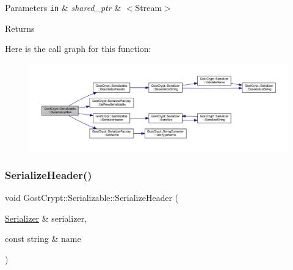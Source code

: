 \begin{DoxyParams}[1]{Parameters}
\mbox{\tt in}  & {\em shared\+\_\+ptr} & $<$\+Stream$>$ \\
\hline
\end{DoxyParams}
\begin{DoxyReturn}{Returns}

\end{DoxyReturn}
Here is the call graph for this function\+:
\nopagebreak
\begin{figure}[H]
\begin{center}
\leavevmode
\includegraphics[width=350pt]{class_gost_crypt_1_1_serializable_a2a1a45654e086d8b894d027bb781627a_cgraph}
\end{center}
\end{figure}
\mbox{\label{class_gost_crypt_1_1_serializable_a6228b7fc3bb16947ea6b39aa3f20aca1}} 
\subsubsection{\texorpdfstring{Serialize\+Header()}{SerializeHeader()}}
{\footnotesize\ttfamily void Gost\+Crypt\+::\+Serializable\+::\+Serialize\+Header (\begin{DoxyParamCaption}\item[{\hyperlink{class_gost_crypt_1_1_serializer}{Serializer} \&}]{serializer,  }\item[{const string \&}]{name }\end{DoxyParamCaption})\hspace{0.3cm}{\ttfamily [static]}}


